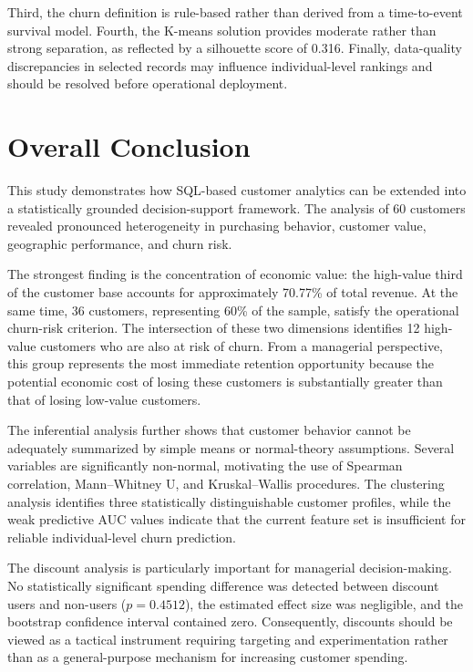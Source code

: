 \documentclass[11pt,a4paper]{article}
\begin{document}
Third, the churn definition is rule-based rather than derived from a
time-to-event survival model. Fourth, the K-means solution provides
moderate rather than strong separation, as reflected by a silhouette
score of 0.316. Finally, data-quality discrepancies in selected records
may influence individual-level rankings and should be resolved before
operational deployment.

\section{Overall Conclusion}

This study demonstrates how SQL-based customer analytics can be extended
into a statistically grounded decision-support framework. The analysis
of 60 customers revealed pronounced heterogeneity in purchasing behavior,
customer value, geographic performance, and churn risk.

The strongest finding is the concentration of economic value: the
high-value third of the customer base accounts for approximately 70.77\%
of total revenue. At the same time, 36 customers, representing 60\% of
the sample, satisfy the operational churn-risk criterion. The intersection
of these two dimensions identifies 12 high-value customers who are also
at risk of churn. From a managerial perspective, this group represents
the most immediate retention opportunity because the potential economic
cost of losing these customers is substantially greater than that of
losing low-value customers.

The inferential analysis further shows that customer behavior cannot be
adequately summarized by simple means or normal-theory assumptions.
Several variables are significantly non-normal, motivating the use of
Spearman correlation, Mann--Whitney U, and Kruskal--Wallis procedures.
The clustering analysis identifies three statistically distinguishable
customer profiles, while the weak predictive AUC values indicate that
the current feature set is insufficient for reliable individual-level
churn prediction.

The discount analysis is particularly important for managerial
decision-making. No statistically significant spending difference was
detected between discount users and non-users ($p=0.4512$), the estimated
effect size was negligible, and the bootstrap confidence interval
contained zero. Consequently, discounts should be viewed as a tactical
instrument requiring targeting and experimentation rather than as a
general-purpose mechanism for increasing customer spending.
\end{document}
